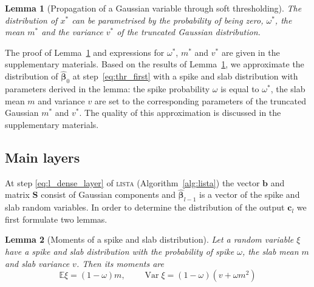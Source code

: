 \documentclass{article}
\newtheorem{lemma}{Lemma}
\begin{document}
\begin{lemma}[Propagation of a Gaussian variable through soft thresholding]
\label{thm:soft_thresholding}
The distribution of $x^*$ can be parametrised by the probability of being zero, $\omega^*$, the mean $m^*$ and the variance $v^*$ of the truncated Gaussian distribution.
\end{lemma}

The proof of Lemma~\ref{thm:soft_thresholding} and expressions for $\omega^*$, $m^*$ and $v^*$ are given in the supplementary materials. Based on the results of Lemma~\ref{thm:soft_thresholding}, we approximate the distribution of $\widehat{\boldsymbol\beta}_0$ at step~\ref{eq:thr_first} with a spike and slab distribution with parameters derived in the lemma: the spike probability $\omega$ is equal to $\omega^*$, the slab mean $m$ and variance $v$ are set to the corresponding parameters of the truncated Gaussian $m^*$ and $v^*$. The quality of this approximation is discussed in the supplementary materials.

\subsection{Main layers}
At step \ref{eq:l_dense_layer} of \textsc{lista} (Algorithm~\ref{alg:lista}) the vector $\mathbf{b}$ and matrix $\mathbf{S}$ consist of Gaussian components and $\widehat{\boldsymbol\beta}_{l-1}$ is a vector of the spike and slab random variables. In order to determine the distribution of the output $\mathbf{c}_l$ we first formulate two lemmas.

\begin{lemma}[Moments of a spike and slab distribution]
\label{thm:moments_spsl}
Let a random variable $\xi$ have a spike and slab distribution with the probability of spike $\omega$, the slab mean $m$ and slab variance $v$. Then its moments are
\begin{equation}
\mathbb{E}\xi = (1-\omega)m, \qquad \operatorname{Var}\xi = (1-\omega)(v + \omega m^2)
\end{equation}
\end{lemma}
\end{document}
